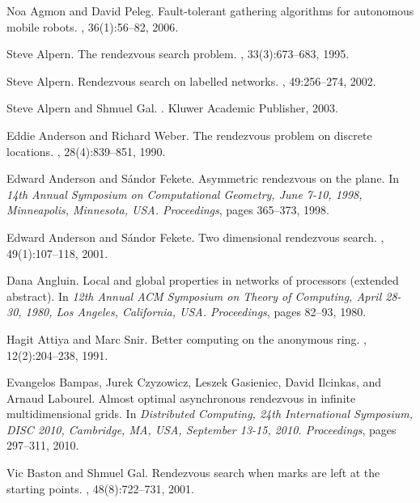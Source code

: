 \documentclass[11pt]{article}
\begin{document}
\begin{thebibliography}{10}

Noa Agmon and David Peleg.
\newblock Fault-tolerant gathering algorithms for autonomous mobile robots.
, 36(1):56--82, 2006.

Steve Alpern.
\newblock The rendezvous search problem.
, 33(3):673--683, 1995.

Steve Alpern.
\newblock Rendezvous search on labelled networks.
, 49:256--274, 2002.

Steve Alpern and Shmuel Gal.
.
\newblock Kluwer Academic Publisher, 2003.

Eddie Anderson and Richard Weber.
\newblock The rendezvous problem on discrete locations.
, 28(4):839--851, 1990.

Edward Anderson and S{\'{a}}ndor Fekete.
\newblock Asymmetric rendezvous on the plane.
\newblock In {\em 14th Annual Symposium on Computational Geometry, June 7-10, 1998, Minneapolis, Minnesota, USA. Proceedings}, pages 365--373, 1998.

Edward Anderson and S{\'{a}}ndor Fekete.
\newblock Two dimensional rendezvous search.
, 49(1):107--118, 2001.

Dana Angluin.
\newblock Local and global properties in networks of processors (extended
  abstract).
\newblock In {\em 12th Annual {ACM} Symposium on Theory of
  Computing, April 28-30, 1980, Los Angeles, California, {USA}. Proceedings}, pages 82--93,
  1980.


Hagit Attiya and Marc Snir.
\newblock Better computing on the anonymous ring.
, 12(2):204--238, 1991.


Evangelos Bampas, Jurek Czyzowicz, Leszek Gasieniec, David Ilcinkas, and Arnaud
  Labourel.
\newblock Almost optimal asynchronous rendezvous in infinite multidimensional
  grids.
\newblock In {\em Distributed Computing, 24th International Symposium, {DISC}
  2010, Cambridge, MA, USA, September 13-15, 2010. Proceedings}, pages
  297--311, 2010.

Vic Baston and Shmuel Gal.
\newblock Rendezvous search when marks are left at the starting points.
, 48(8):722--731, 2001.


\end{thebibliography}
\end{document}
